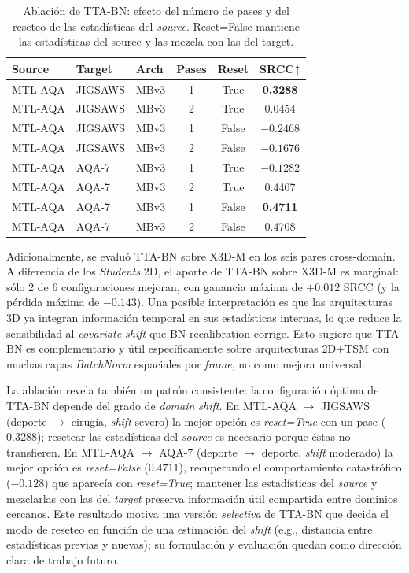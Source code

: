\begin{table}[H]
\centering
\caption{Ablación de TTA-BN: efecto del número de pases y del reseteo de las estadísticas del \textit{source}. Reset=False mantiene las estadísticas del source y las mezcla con las del target.}
\label{tab:tta_ablation}
\small
\begin{tabular}{lllccc}
\toprule
\textbf{Source} & \textbf{Target} & \textbf{Arch} & \textbf{Pases} & \textbf{Reset} & \textbf{SRCC}↑ \\
\midrule
MTL-AQA & JIGSAWS & MBv3 & 1 & True  & \textbf{0.3288} \\
MTL-AQA & JIGSAWS & MBv3 & 2 & True  & 0.0454 \\
MTL-AQA & JIGSAWS & MBv3 & 1 & False & $-0.2468$ \\
MTL-AQA & JIGSAWS & MBv3 & 2 & False & $-0.1676$ \\
\midrule
MTL-AQA & AQA-7   & MBv3 & 1 & True  & $-0.1282$ \\
MTL-AQA & AQA-7   & MBv3 & 2 & True  & 0.4407          \\
MTL-AQA & AQA-7   & MBv3 & 1 & False & \textbf{0.4711} \\
MTL-AQA & AQA-7   & MBv3 & 2 & False & 0.4708          \\
\bottomrule
\end{tabular}
\end{table}

Adicionalmente, se evaluó TTA-BN sobre X3D-M en los seis pares cross-domain. A diferencia de los \textit{Students} 2D, el aporte de TTA-BN sobre X3D-M es marginal: sólo 2 de 6 configuraciones mejoran, con ganancia máxima de $+0.012$ \ac{SRCC} (y la pérdida máxima de $-0.143$). Una posible interpretación es que las arquitecturas 3D ya integran información temporal en sus estadísticas internas, lo que reduce la sensibilidad al \textit{covariate shift} que BN-recalibration corrige. Esto sugiere que TTA-BN es complementario y útil específicamente sobre arquitecturas 2D+TSM con muchas capas \textit{BatchNorm} espaciales por \textit{frame}, no como mejora universal.

La ablación revela también un patrón consistente: la configuración óptima de TTA-BN depende del grado de \textit{domain shift}. En MTL-AQA $\to$ JIGSAWS (deporte $\to$ cirugía, \textit{shift} severo) la mejor opción es \textit{reset=True} con un pase ($0.3288$); resetear las estadísticas del \textit{source} es necesario porque éstas no transfieren. En MTL-AQA $\to$ AQA-7 (deporte $\to$ deporte, \textit{shift} moderado) la mejor opción es \textit{reset=False} ($0.4711$), recuperando el comportamiento catastrófico ($-0.128$) que aparecía con \textit{reset=True}; mantener las estadísticas del \textit{source} y mezclarlas con las del \textit{target} preserva información útil compartida entre dominios cercanos. Este resultado motiva una versión \emph{selectiva} de TTA-BN que decida el modo de reseteo en función de una estimación del \textit{shift} (e.g., distancia entre estadísticas previas y nuevas); su formulación y evaluación quedan como dirección clara de trabajo futuro.

